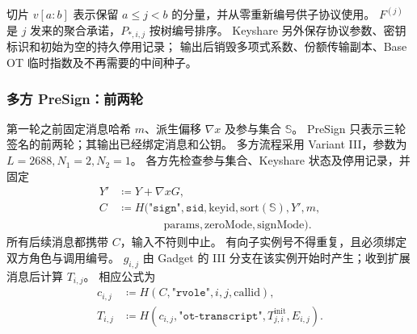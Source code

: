 切片 $v[a:b]$ 表示保留 $a\le j<b$ 的分量，并从零重新编号供子协议使用。
$F^{(j)}$ 是 $j$ 发来的聚合承诺，$P_{*,i,j}$ 按树编号排序。
Keyshare 另外保存协议参数、密钥标识和初始为空的持久停用记录；
输出后销毁多项式系数、份额传输副本、Base OT 临时指数及不再需要的中间种子。

\subsubsection{多方 PreSign：前两轮}

第一轮之前固定消息哈希 $m$、派生偏移 $\nabla x$ 及参与集合 $\mathbb S$。
PreSign 只表示三轮签名的前两轮；其输出已经绑定消息和公钥。
多方流程采用 Variant III，参数为 $L=2688,N_1=2,N_2=1$。
各方先检查参与集合、Keyshare 状态及停用记录，并固定
\[
  \begin{aligned}
    Y'&\coloneq Y+\nabla xG,\\
    C&\coloneq H(\texttt{"sign"},\mathtt{sid},\mathrm{keyid},\mathrm{sort}(\mathbb S),Y',m,\\
      &\hspace{4em}\mathrm{params},\mathrm{zeroMode},\mathrm{signMode}).
  \end{aligned}
\]
所有后续消息都携带 $C$，输入不符则中止。
有向子实例号不得重复，且必须绑定双方角色与调用编号。
$g_{i,j}$ 由 Gadget 的 III 分支在该实例开始时产生；收到扩展消息后计算 $T_{i,j}$。
相应公式为
\[
  \begin{aligned}
    c_{i,j}&\coloneq H(C,\texttt{"rvole"},i,j,\mathrm{callid}),\\
    T_{i,j}&\coloneq H(c_{i,j},\texttt{"ot-transcript"},T^{\mathrm{init}}_{j,i},E_{i,j}).
  \end{aligned}
\]

